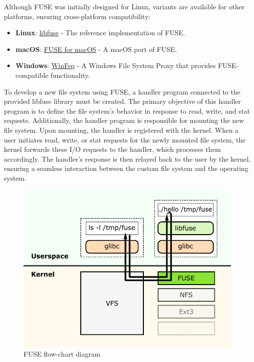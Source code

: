 Although FUSE was initially designed for Linux, variants are available for other platforms, ensuring cross-platform compatibility:

\begin{itemize}
    \item \textbf{Linux}: \href{https://github.com/libfuse/libfuse}{libfuse} - The reference implementation of FUSE.
    \item \textbf{macOS}: \href{https://osxfuse.github.io/}{FUSE for macOS} - A macOS port of FUSE.
    \item \textbf{Windows}: \href{https://github.com/billziss-gh/winfsp}{WinFsp} - A Windows File System Proxy that provides FUSE-compatible functionality.
\end{itemize}

To develop a new file system using FUSE, a handler program connected to the provided libfuse library must be created.
The primary objective of this handler program is to define the file system's behavior in response to read, write, and stat requests.
Additionally, the handler program is responsible for mounting the new file system.
Upon mounting, the handler is registered with the kernel.
When a user initiates read, write, or stat requests for the newly mounted file system, the kernel forwards these I/O requests to the handler, which processes them accordingly.
The handler's response is then relayed back to the user by the kernel, ensuring a seamless interaction between the custom file system and the operating system.

\begin{figure}[ht]
    \centering
    \includegraphics[width=\linewidth]{img/fuse_diagram}
    \caption{FUSE flow-chart diagram}
    \label{fig:fuse-diagram}
\end{figure}

